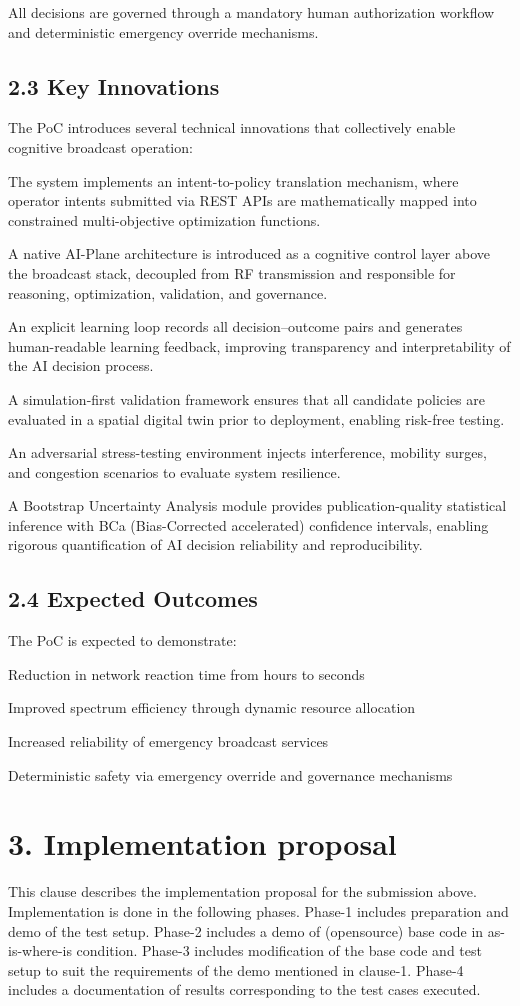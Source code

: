 \documentclass{article}
\begin{document}
All decisions are governed through a mandatory human authorization workflow and deterministic emergency override mechanisms.

\subsection{2.3 Key Innovations}
The PoC introduces several technical innovations that collectively enable cognitive broadcast operation:

The system implements an intent-to-policy translation mechanism, where operator intents submitted via REST APIs are mathematically mapped into constrained multi-objective optimization functions.

A native AI-Plane architecture is introduced as a cognitive control layer above the broadcast stack, decoupled from RF transmission and responsible for reasoning, optimization, validation, and governance.

An explicit learning loop records all decision–outcome pairs and generates human-readable learning feedback, improving transparency and interpretability of the AI decision process.

A simulation-first validation framework ensures that all candidate policies are evaluated in a spatial digital twin prior to deployment, enabling risk-free testing.

An adversarial stress-testing environment injects interference, mobility surges, and congestion scenarios to evaluate system resilience.

A Bootstrap Uncertainty Analysis module provides publication-quality statistical inference with BCa (Bias-Corrected accelerated) confidence intervals, enabling rigorous quantification of AI decision reliability and reproducibility.

\subsection{2.4 Expected Outcomes}
The PoC is expected to demonstrate:

Reduction in network reaction time from hours to seconds

Improved spectrum efficiency through dynamic resource allocation

Increased reliability of emergency broadcast services

Deterministic safety via emergency override and governance mechanisms

\section{3. Implementation proposal}
This clause describes the implementation proposal for the submission above. Implementation is done in the following phases. Phase-1 includes preparation and demo of the test setup. Phase-2 includes a demo of (opensource) base code in as-is-where-is condition. Phase-3 includes modification of the base code and test setup to suit the requirements of the demo mentioned in clause-1. Phase-4 includes a documentation of results corresponding to the test cases executed.
\end{document}
